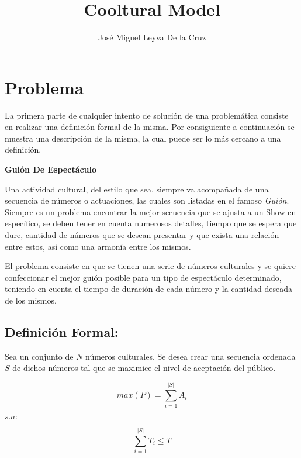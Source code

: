 \documentclass{article}
\title{Cooltural Model}
\author{Jos\'e Miguel Leyva De la Cruz}
\date{}
\begin{document}
\maketitle
\setlength{\parindent}{1.5em}

\section{Problema}

La primera parte de cualquier intento de soluci\'on de una problem\'atica consiste en realizar
una definici\'on formal de la misma. Por consiguiente a continuaci\'on se muestra una descripci\'on
de la misma, la cual puede ser lo m\'as cercano a una definici\'on.

\begin{center}
    \textbf{Gui\'on De Espect\'aculo}
\end{center}

Una actividad cultural, del estilo que sea, siempre va acompa\~nada de una secuencia de n\'umeros 
o actuaciones, las cuales son listadas en el famoso \textit{Gui\'on}. Siempre es un problema encontrar
la mejor secuencia que se ajusta a un Show en espec\'ifico, se deben tener en cuenta numerosos detalles,
tiempo que se espera que dure, cantidad de n\'umeros que se desean presentar y que exista una relaci\'on
entre estos, as\'i como una armon\'ia entre los mismos. 

El problema consiste en que se tienen una serie de n\'umeros culturales y se quiere confeccionar el
mejor gui\'on posible para un tipo de espect\'aculo determinado, teniendo en cuenta el tiempo de duraci\'on
de cada n\'umero y la cantidad deseada de los mismos.


\subsection*{Definici\'on Formal:}
Sea un conjunto de  $N$ n\'umeros culturales. Se desea crear una secuencia ordenada $S$ 
de dichos n\'umeros tal que se maximice el nivel de aceptaci\'on del p\'ublico.

\begin{equation*}
    max(P) = \sum_{i = 1}^{|S|} A_i
\end{equation*}

\begin{center}
    $s.a:$
\end{center}

\begin{equation*}
    \sum_{i = 1}^{|S|} T_i \leq T
\end{equation*}
\end{document}
